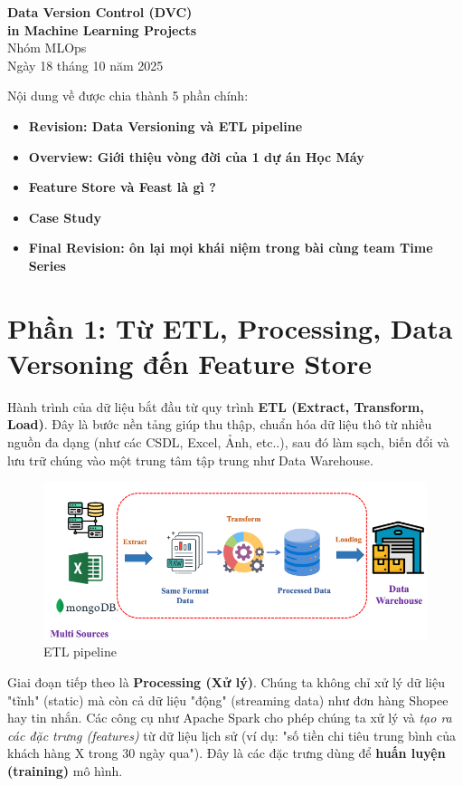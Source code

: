 \documentclass[11pt]{article}
\renewcommand{\maketitle}{%
    \begin{center}
        \fontsize{18}{20}\selectfont\textbf{Data Version Control (DVC) \\[0.2em] in Machine Learning Projects}\\[1em]
        \fontsize{14}{16}\selectfont Nhóm MLOps\\[0.5em]
        \fontsize{14}{16}\selectfont Ngày 18 tháng 10 năm 2025
    \end{center}
    \vspace{1.5em}
}
\begin{document}
\maketitle

\begin{summarybox}
Nội dung về được chia thành 5 phần chính:
    \begin{itemize}
	\item \textbf{Revision: Data Versioning và ETL pipeline}
	\item \textbf{Overview: Giới thiệu vòng đời của 1 dự án Học Máy}
	\item \textbf{Feature Store và Feast là gì ?}
	\item \textbf{Case Study}
	\item \textbf{Final Revision: ôn lại mọi khái niệm trong bài cùng team Time Series}
    \end{itemize}
\end{summarybox}

\section{Phần 1: Từ ETL, Processing, Data Versoning đến Feature Store}
Hành trình của dữ liệu bắt đầu từ quy trình \textbf{ETL (Extract, Transform, Load)}. Đây là bước nền tảng giúp thu thập, chuẩn hóa dữ liệu thô từ nhiều nguồn đa dạng (như các CSDL, Excel, Ảnh, etc..), sau đó làm sạch, biến đổi và lưu trữ chúng vào một trung tâm tập trung như Data Warehouse.
\begin{figure}[H]
    \centering
    \includegraphics[width=0.8\linewidth]{images/etl.png}
    \caption{ETL pipeline}
\end{figure}

Giai đoạn tiếp theo là \textbf{Processing (Xử lý)}. Chúng ta không chỉ xử lý dữ liệu "tĩnh" (static) mà còn cả dữ liệu "động" (streaming data) như đơn hàng Shopee hay tin nhắn. Các công cụ như Apache Spark cho phép chúng ta xử lý và \textit{tạo ra các đặc trưng (features)} từ dữ liệu lịch sử (ví dụ: "số tiền chi tiêu trung bình của khách hàng X trong 30 ngày qua"). Đây là các đặc trưng dùng để \textbf{huấn luyện (training)} mô hình.
\end{document}
